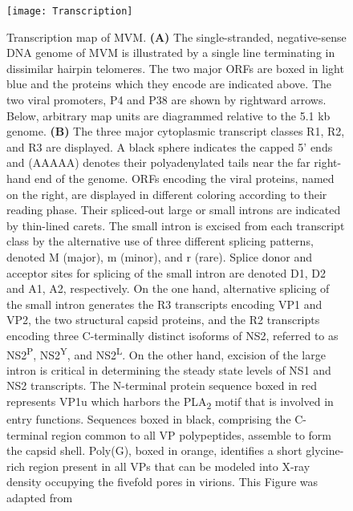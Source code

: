        

\begin{figure}[H]
\centering
  \texttt{[image: Transcription]}
  \caption[Transcription map of MVM]
   {Transcription map of MVM. \textbf{(A)} The single-stranded, negative-sense DNA genome of MVM is illustrated by a single line terminating in dissimilar hairpin telomeres. The two major ORFs are boxed in light blue and the proteins which they encode are indicated above. The two viral promoters, P4 and P38 are shown by rightward arrows. Below, arbitrary map units are diagrammed relative to the 5.1 kb genome. \textbf{(B)} The three major cytoplasmic transcript classes R1, R2, and R3 are displayed. A black sphere indicates the capped 5’ ends and (AAAAA) denotes their polyadenylated tails near the far right-hand end of the genome. ORFs encoding the viral proteins, named on the right, are displayed in different coloring according to their reading phase. Their spliced-out large or small introns are indicated by thin-lined carets. The small intron is excised from each transcript class by the alternative use of three different splicing patterns, denoted M (major), m (minor), and r (rare). Splice donor and acceptor sites for splicing of the small intron are denoted D1, D2 and A1, A2, respectively. On the one hand, alternative splicing of the small intron generates the R3 transcripts encoding VP1 and VP2, the two structural capsid proteins, and the R2 transcripts encoding three C-terminally distinct isoforms of NS2, referred to as NS2\textsuperscript{P}, NS2\textsuperscript{Y}, and NS2\textsuperscript{L}. On the other hand, excision of the large intron is critical in determining the steady state levels of NS1 and NS2 transcripts. The N-terminal protein sequence boxed in red represents VP1u which harbors the PLA\textsubscript{2} motif that is involved in entry functions. Sequences boxed in black, comprising the C-terminal region common to all VP polypeptides, assemble to form the capsid shell. Poly(G), boxed in orange, identifies a short glycine-rich region present in all VPs that can be modeled into X-ray density occupying the fivefold pores in virions. This Figure was adapted from \cite{small}}
\label{Transcription}
\end{figure}       




